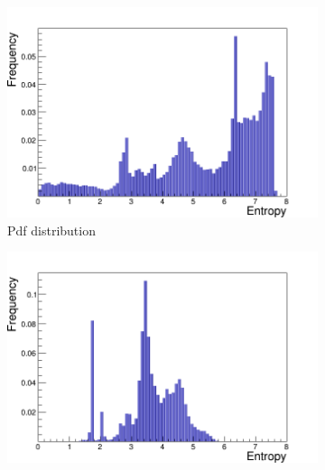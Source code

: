 \begin{figure}[!ht]
  \begin{subfigure}[b]{.5\linewidth}
    \raggedleft
     \includegraphics[scale=0.32]{figures/entropy/Entropy_pdf}
   \caption{Pdf distribution}
    \label{fig:1a}
  \end{subfigure}%
  \begin{subfigure}[b]{.5\linewidth}
    \raggedright
        \includegraphics[scale=0.32]{figures/entropy/Entropy_xls}
    \label{fig:1b}
  \end{subfigure}
  

\end{figure}
